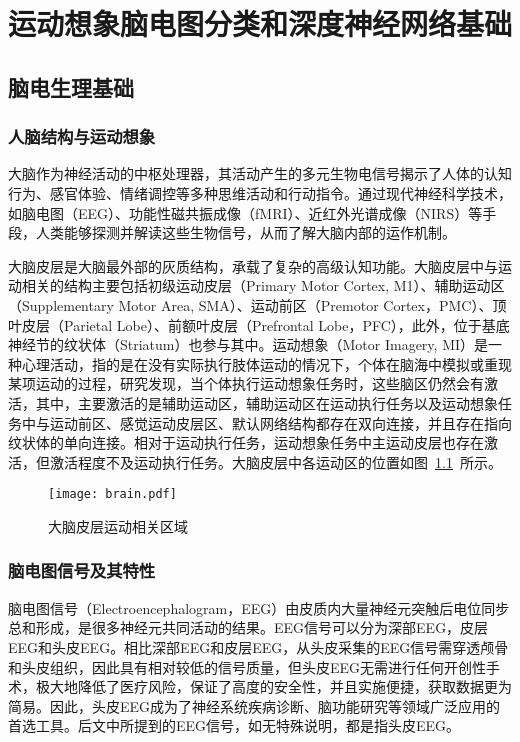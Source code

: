 
\chapter{运动想象脑电图分类和深度神经网络基础}

\section{脑电生理基础}

\subsection{人脑结构与运动想象}

大脑作为神经活动的中枢处理器，其活动产生的多元生物电信号揭示了人体的认知行为、感官体验、情绪调控等多种思维活动和行动指令。通过现代神经科学技术，如脑电图（EEG）、功能性磁共振成像（fMRI）、近红外光谱成像（NIRS）等手段，人类能够探测并解读这些生物信号，从而了解大脑内部的运作机制。

大脑皮层是大脑最外部的灰质结构，承载了复杂的高级认知功能。大脑皮层中与运动相关的结构主要包括初级运动皮层（Primary Motor Cortex, M1）、辅助运动区（Supplementary Motor Area, SMA）、运动前区（Premotor Cortex，PMC）、顶叶皮层（Parietal Lobe）、前额叶皮层（Prefrontal Lobe，PFC），此外，位于基底神经节的纹状体（Striatum）也参与其中。运动想象（Motor Imagery, MI）是一种心理活动，指的是在没有实际执行肢体运动的情况下，个体在脑海中模拟或重现某项运动的过程，研究发现，当个体执行运动想象任务时，这些脑区仍然会有激活，其中，主要激活的是辅助运动区，辅助运动区在运动执行任务以及运动想象任务中与运动前区、感觉运动皮层区、默认网络结构都存在双向连接\cite{solodkin2004fine}，并且存在指向纹状体的单向连接\cite{watanabe2015effects}。相对于运动执行任务，运动想象任务中主运动皮层也存在激活，但激活程度不及运动执行任务\cite{solodkin2004fine}\cite{kasess2008suppressive}。大脑皮层中各运动区的位置如图~\ref{fig:brain}~\cite{penfield1950cerebral}所示。
\begin{figure}
    \centering
    \texttt{[image: brain.pdf]}
    \caption{大脑皮层运动相关区域}
    \label{fig:brain}
\end{figure}

\subsection{脑电图信号及其特性}

脑电图信号（Electroencephalogram，EEG）由皮质内大量神经元突触后电位同步总和形成，是很多神经元共同活动的结果\cite{ZWQX201803022}。EEG信号可以分为深部EEG，皮层EEG和头皮EEG\cite{1022779250.nh}。相比深部EEG和皮层EEG，从头皮采集的EEG信号需穿透颅骨和头皮组织，因此具有相对较低的信号质量，但头皮EEG无需进行任何开创性手术，极大地降低了医疗风险，保证了高度的安全性，并且实施便捷，获取数据更为简易。因此，头皮EEG成为了神经系统疾病诊断、脑功能研究等领域广泛应用的首选工具。后文中所提到的EEG信号，如无特殊说明，都是指头皮EEG。

